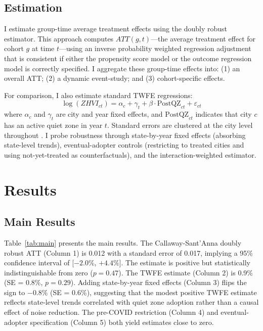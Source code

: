 \documentclass[12pt]{article}
\begin{document}
\subsection{Estimation}

I estimate group-time average treatment effects using the \citet{callaway2021did} doubly robust estimator. This approach computes $ATT(g,t)$---the average treatment effect for cohort $g$ at time $t$---using an inverse probability weighted regression adjustment that is consistent if either the propensity score model or the outcome regression model is correctly specified. I aggregate these group-time effects into: (1) an overall ATT; (2) a dynamic event-study; and (3) cohort-specific effects.

For comparison, I also estimate standard TWFE regressions:
\begin{equation}
\log(ZHVI_{ct}) = \alpha_c + \gamma_t + \beta \cdot \text{PostQZ}_{ct} + \varepsilon_{ct}
\end{equation}
where $\alpha_c$ and $\gamma_t$ are city and year fixed effects, and $\text{PostQZ}_{ct}$ indicates that city $c$ has an active quiet zone in year $t$. Standard errors are clustered at the city level throughout \citep{roth2023pretest}. I probe robustness through state-by-year fixed effects (absorbing state-level trends), eventual-adopter controls (restricting to treated cities and using not-yet-treated as counterfactuals), and the \citet{sunab2021} interaction-weighted estimator.


\section{Results}

\subsection{Main Results}



Table~\ref{tab:main} presents the main results. The Callaway-Sant'Anna doubly robust ATT (Column 1) is 0.012 with a standard error of 0.017, implying a 95\% confidence interval of [$-2.0\%$, $+4.4\%$]. The estimate is positive but statistically indistinguishable from zero ($p = 0.47$). The TWFE estimate (Column 2) is 0.9\% (SE = 0.8\%, $p = 0.29$). Adding state-by-year fixed effects (Column 3) flips the sign to $-0.8\%$ (SE = 0.6\%), suggesting that the modest positive TWFE estimate reflects state-level trends correlated with quiet zone adoption rather than a causal effect of noise reduction. The pre-COVID restriction (Column 4) and eventual-adopter specification (Column 5) both yield estimates close to zero.
\end{document}
